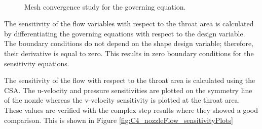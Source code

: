 \begin{figure}[H]
    \centering
    \quad
    \\
    \caption{Mesh convergence study for the governing equation.}
    \label{fig:C4_nozzleFlow_meshConvergenceRate}
\end{figure}

The sensitivity of the flow variables with respect to the throat area is calculated by differentiating the governing equations with respect to the design variable. The boundary conditions do not depend on the shape design variable; therefore, their derivative is equal to zero. This results in zero boundary conditions for the sensitivity equations.

The sensitivity of the flow with respect to the throat area is calculated using the CSA. The u-velocity and pressure sensitivities are plotted on the symmetry line of the nozzle whereas the v-velocity sensitivity is plotted at the throat area. These values are verified with the complex step results where they showed a good comparison. This is shown in Figure \ref{fig:C4_nozzleFlow_sensitivityPlots}

